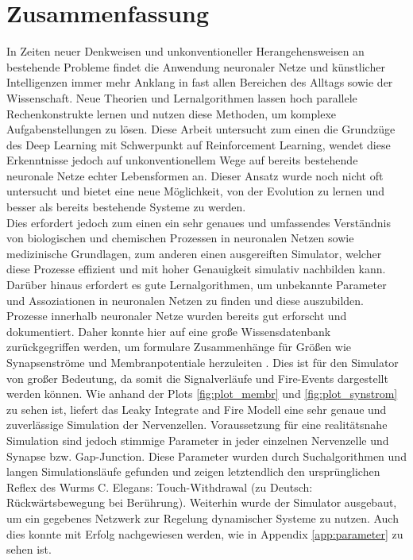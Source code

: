 \section{Zusammenfassung}
\label{sec:erg_zsm}
	In Zeiten neuer Denkweisen und unkonventioneller Herangehensweisen an bestehende Probleme findet die Anwendung neuronaler Netze und künstlicher Intelligenzen immer mehr Anklang in fast allen Bereichen des Alltags sowie der Wissenschaft. Neue Theorien und Lernalgorithmen lassen hoch parallele Rechenkonstrukte lernen und nutzen diese Methoden, um komplexe Aufgabenstellungen zu lösen. Diese Arbeit untersucht zum einen die Grundzüge des Deep Learning mit Schwerpunkt auf Reinforcement Learning, wendet diese Erkenntnisse jedoch auf unkonventionellem Wege auf bereits bestehende neuronale Netze echter Lebensformen an. Dieser Ansatz wurde noch nicht oft untersucht und bietet eine neue Möglichkeit, von der Evolution zu lernen und besser als bereits bestehende Systeme zu werden.\\
	Dies erfordert jedoch zum einen ein sehr genaues und umfassendes Verständnis von biologischen und chemischen Prozessen in neuronalen Netzen sowie medizinische Grundlagen, zum anderen einen ausgereiften Simulator, welcher diese Prozesse effizient und mit hoher Genauigkeit simulativ nachbilden kann. Darüber hinaus erfordert es gute Lernalgorithmen, um unbekannte Parameter und Assoziationen in neuronalen Netzen zu finden und diese auszubilden.\\
	Prozesse innerhalb neuronaler Netze wurden bereits gut erforscht und dokumentiert. Daher konnte hier auf eine große Wissensdatenbank zurückgegriffen werden, um formulare Zusammenhänge für Größen wie Synapsenströme und Membranpotentiale herzuleiten \cite{NeuronalDynamics}. Dies ist für den Simulator von großer Bedeutung, da somit die Signalverläufe und Fire-Events dargestellt werden können. Wie anhand der Plots \ref{fig:plot_membr} und \ref{fig:plot_synstrom} zu sehen ist, liefert das Leaky Integrate and Fire Modell eine sehr genaue und zuverlässige Simulation der Nervenzellen. Voraussetzung für eine realitätsnahe Simulation sind jedoch stimmige Parameter in jeder einzelnen Nervenzelle und Synapse bzw. Gap-Junction. Diese Parameter wurden durch Suchalgorithmen und langen Simulationsläufe gefunden und zeigen letztendlich den ursprünglichen Reflex des Wurms C. Elegans: Touch-Withdrawal (zu Deutsch: Rückwärtsbewegung bei Berührung). Weiterhin wurde der Simulator ausgebaut, um ein gegebenes Netzwerk zur Regelung dynamischer Systeme zu nutzen. Auch dies konnte mit Erfolg nachgewiesen werden, wie in Appendix \ref{app:parameter} zu sehen ist.\\
